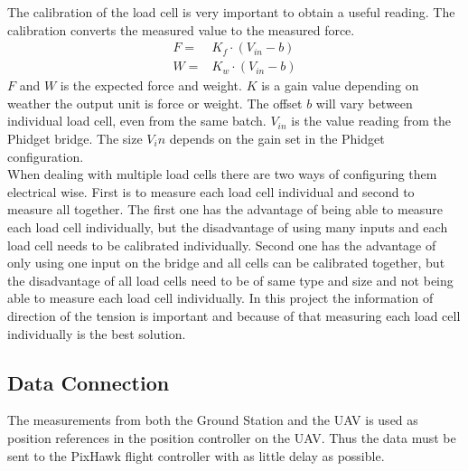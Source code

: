 \noindent
The calibration of the load cell is very important to obtain a useful reading. The calibration converts the measured value to the measured force.  
\begin{eqnarray}
F =& K_f \cdot (V_{in} - b)\\
W =& K_w \cdot (V_{in} - b)
\end{eqnarray}
$F$ and $W$ is the expected force and weight. $K$ is a gain value depending on weather the output unit is force or weight. The offset $b$ will vary between individual load cell, even from the same batch. $V_{in}$ is the value reading from the Phidget bridge. The size $V_in$ depends on the gain set in the Phidget configuration.\\
\noindent
When dealing with multiple load cells there are two ways of configuring them electrical wise. First is to measure each load cell individual and second to measure all together. The first one has the advantage of being able to measure each load cell individually, but the disadvantage of using many inputs and each load cell needs to be calibrated individually. Second one has the advantage of only using one input on the bridge and all cells can be calibrated together, but the disadvantage of all load cells need to be of same type and size and not being able to measure each load cell individually. In this project the information of direction of the tension is important and because of that measuring each load cell individually is the best solution\cite{PhidgetsInc.2012}.

\subsection{Data Connection}
The measurements from both the Ground Station and the UAV is used as position references in the position controller on the UAV. Thus the data must be sent to the PixHawk flight controller with as little delay as possible.

\newpage
